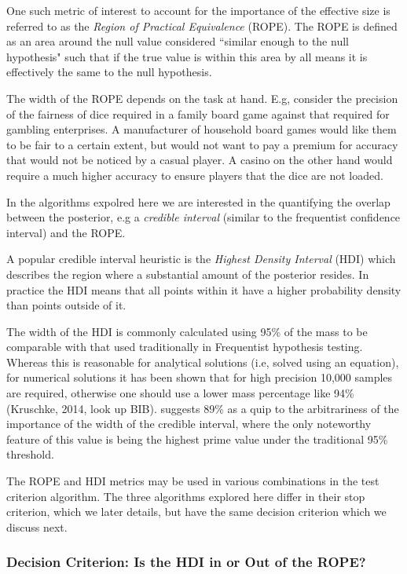 One such metric of interest to account for the importance of the effective size
is referred to as the
\textit{Region of Practical Equivalence} (ROPE).
The ROPE is defined as an area around the null value considered “similar enough 
to the null hypothesis" such that if the true value is within this area by all
means it is effectively the same to the null hypothesis.

The width of the ROPE depends on the task at hand.
E.g, consider the precision of the fairness of dice required in a family board game
against that required for gambling enterprises.
A manufacturer of household board games would like them to be fair to a certain extent,
but would not want to pay a premium for accuracy that would not be noticed by a casual
player. A casino on the other hand would require a much higher accuracy to ensure
players that the dice are not loaded.

In the algorithms expolred here we are interested in the quantifying the overlap
between the posterior, e.g a \textit{credible interval} (similar to the frequentist confidence interval) and the ROPE.

A popular credible interval heuristic is the \textit{Highest Density Interval} (HDI)
which describes the region where a substantial amount of the posterior resides.
In practice the HDI means that all points within it have a higher
probability density than points outside of it.

The width of the HDI is commonly calculated using 95\% of the mass to be comparable
with that used traditionally in Frequentist hypothesis testing.
Whereas this is reasonable for analytical solutions (i.e, solved using an equation),
for numerical solutions it has been shown that for high precision 10,000 samples are
required, otherwise one should use a lower mass percentage like 94\% (Kruschke, 2014, look up BIB).
\cite{mcelreath2016} suggests 89\% as a quip to the arbitrariness of the importance of the
width of the credible interval, where the only noteworthy feature of this value is being
the highest prime value under the traditional 95\% threshold.  

The ROPE and HDI metrics may be used in various combinations in the
test criterion algorithm.
The three algorithms explored here differ in their stop criterion, which we later
details, but have the same decision criterion which we discuss next.


\subsubsection{Decision Criterion: Is the HDI in or Out of the ROPE?}\label{sec:decision_criterion}

